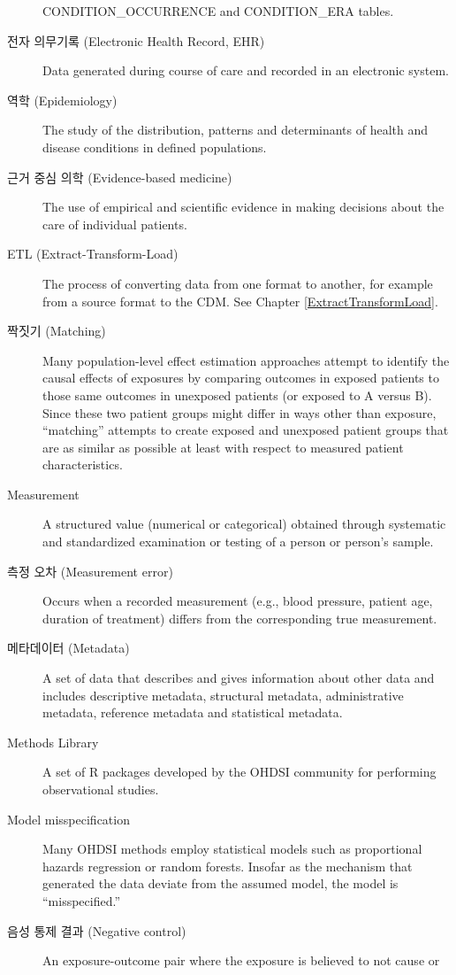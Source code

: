 \documentclass[11pt]{book}
\theoremstyle{definition}
\theoremstyle{definition}
\theoremstyle{definition}
\theoremstyle{remark}
\begin{document}
\begin{description}
CONDITION\_OCCURRENCE and CONDITION\_ERA tables.
\item[전자 의무기록 (Electronic Health Record, EHR)]
Data generated during course of care and recorded in an electronic
system.
\item[역학 (Epidemiology)]
The study of the distribution, patterns and determinants of health and
disease conditions in defined populations.
\item[근거 중심 의학 (Evidence-based medicine)]
The use of empirical and scientific evidence in making decisions about
the care of individual patients.
\item[ETL (Extract-Transform-Load)]
The process of converting data from one format to another, for example
from a source format to the CDM. See Chapter \ref{ExtractTransformLoad}.
\item[짝짓기 (Matching)]
Many population-level effect estimation approaches attempt to identify
the causal effects of exposures by comparing outcomes in exposed
patients to those same outcomes in unexposed patients (or exposed to A
versus B). Since these two patient groups might differ in ways other
than exposure, ``matching'' attempts to create exposed and unexposed
patient groups that are as similar as possible at least with respect to
measured patient characteristics.
\item[Measurement]
A structured value (numerical or categorical) obtained through
systematic and standardized examination or testing of a person or
person's sample.
\item[측정 오차 (Measurement error)]
Occurs when a recorded measurement (e.g., blood pressure, patient age,
duration of treatment) differs from the corresponding true measurement.
\item[메타데이터 (Metadata)]
A set of data that describes and gives information about other data and
includes descriptive metadata, structural metadata, administrative
metadata, reference metadata and statistical metadata.
\item[Methods Library]
A set of R packages developed by the OHDSI community for performing
observational studies.
\item[Model misspecification]
Many OHDSI methods employ statistical models such as proportional
hazards regression or random forests. Insofar as the mechanism that
generated the data deviate from the assumed model, the model is
``misspecified.''
\item[음성 통제 결과 (Negative control)]
An exposure-outcome pair where the exposure is believed to not cause or

\end{description}
\end{document}
